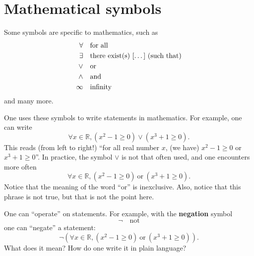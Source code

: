 \documentclass[
	fontsize=10pt, %
	twoside=true, %
	secnumdepth=1, %
	numbers=noenddot, %
]{kaobook}
\begin{document}
\section{Mathematical symbols}
Some symbols are specific to mathematics, such as
\begin{equation*}
\begin{split}
\forall&\quad \text{for all}\\
\exists&\quad \text{there exist(s)~[\dots]~(such that)}\\
\lor&\quad \text{or}\\
\land&\quad \text{and}\\
\infty&\quad \text{infinity}
\end{split}
\end{equation*}
and many more.

One uses these symbols to write statements in mathematics. For example, one can write
\begin{equation*}
\forall x\in\mathbb{R}, (x^2-1\geq 0)\lor (x^3+1\geq 0).
\end{equation*}
This reads (from left to right!) ``for all real number $x$, (we have) $x^2-1\geq 0$ or $x^3+1\geq 0$''. In practice, the symbol $\lor$ is not that often used, and one encounters more often
\begin{equation*}
\forall x\in\mathbb{R}, (x^2-1\geq 0)~\text{or}~(x^3+1\geq 0).
\end{equation*}
Notice that the meaning of the word ``or'' is inexclusive. Also, notice that this phrase is not true, but that is not the point here.

One can ``operate'' on statements. For example, with the \textbf{negation} symbol
\begin{equation*}
\neg\quad \text{not}
\end{equation*}
one can ``negate'' a statement:
\begin{equation*}
\neg \left(\forall x\in\mathbb{R}, (x^2-1\geq 0)~\text{or}~(x^3+1\geq 0)\right).
\end{equation*}
What does it mean? How do one write it in plain language?
\end{document}

